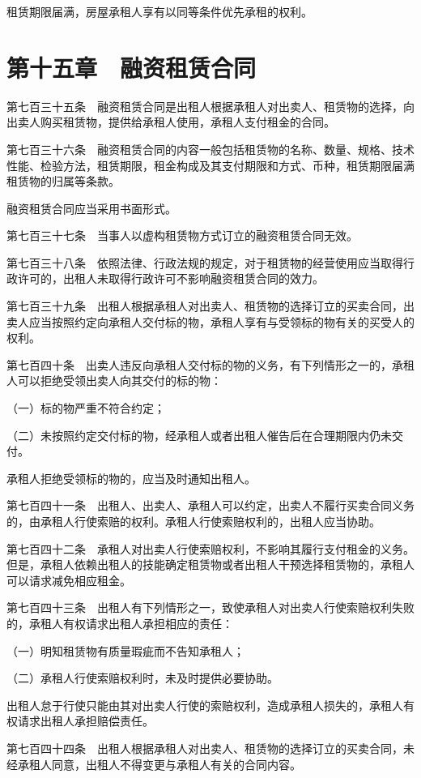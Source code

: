 \documentclass[UTF8,12pt,a4paper]{ctexbook}
\begin{document}
租赁期限届满，房屋承租人享有以同等条件优先承租的权利。

\section*{第十五章　融资租赁合同}

第七百三十五条　融资租赁合同是出租人根据承租人对出卖人、租赁物的选择，向出卖人购买租赁物，提供给承租人使用，承租人支付租金的合同。

第七百三十六条　融资租赁合同的内容一般包括租赁物的名称、数量、规格、技术性能、检验方法，租赁期限，租金构成及其支付期限和方式、币种，租赁期限届满租赁物的归属等条款。

融资租赁合同应当采用书面形式。

第七百三十七条　当事人以虚构租赁物方式订立的融资租赁合同无效。

第七百三十八条　依照法律、行政法规的规定，对于租赁物的经营使用应当取得行政许可的，出租人未取得行政许可不影响融资租赁合同的效力。

第七百三十九条　出租人根据承租人对出卖人、租赁物的选择订立的买卖合同，出卖人应当按照约定向承租人交付标的物，承租人享有与受领标的物有关的买受人的权利。

第七百四十条　出卖人违反向承租人交付标的物的义务，有下列情形之一的，承租人可以拒绝受领出卖人向其交付的标的物：

（一）标的物严重不符合约定；

（二）未按照约定交付标的物，经承租人或者出租人催告后在合理期限内仍未交付。

承租人拒绝受领标的物的，应当及时通知出租人。

第七百四十一条　出租人、出卖人、承租人可以约定，出卖人不履行买卖合同义务的，由承租人行使索赔的权利。承租人行使索赔权利的，出租人应当协助。

第七百四十二条　承租人对出卖人行使索赔权利，不影响其履行支付租金的义务。但是，承租人依赖出租人的技能确定租赁物或者出租人干预选择租赁物的，承租人可以请求减免相应租金。

第七百四十三条　出租人有下列情形之一，致使承租人对出卖人行使索赔权利失败的，承租人有权请求出租人承担相应的责任：

（一）明知租赁物有质量瑕疵而不告知承租人；

（二）承租人行使索赔权利时，未及时提供必要协助。

出租人怠于行使只能由其对出卖人行使的索赔权利，造成承租人损失的，承租人有权请求出租人承担赔偿责任。

第七百四十四条　出租人根据承租人对出卖人、租赁物的选择订立的买卖合同，未经承租人同意，出租人不得变更与承租人有关的合同内容。
\end{document}
